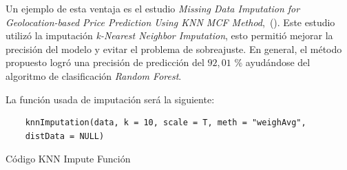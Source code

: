 Un ejemplo de esta ventaja es el estudio \textit{Missing Data Imputation for Geolocation-based Price Prediction Using KNN MCF Method},~(\cite{Sanjar2020}). Este estudio utilizó la imputación \textit{k-Nearest Neighbor Imputation}, esto permitió mejorar la precisión del modelo y evitar el problema de sobreajuste. En general, el método propuesto logró una precisión de predicción del $92,01$ \% ayudándose del algoritmo de clasificación \textit{Random Forest}. 

La función usada de imputación será la siguiente:

\begin{code}[H]
\begin{lstlisting}
    knnImputation(data, k = 10, scale = T, meth = "weighAvg",
    distData = NULL)
\end{lstlisting}
\caption{Código KNN Impute Función}
\label{cod:snipet-knn-impute}
\end{code}




 






